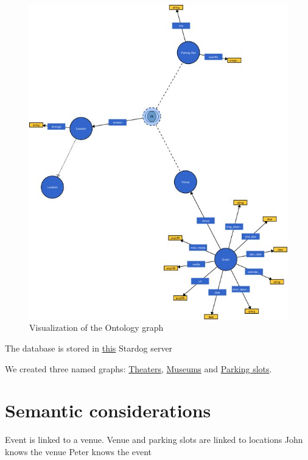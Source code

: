 \documentclass[runningheads,a4paper]{../../StyleFiles/llncs}
\begin{document}
\begin{figure}[h]
	\centering
	\includegraphics[width=1\textwidth]{img/vocab-graph.jpg}
	\caption{Visualization of the Ontology graph}
	\label{fig:instance}
\end{figure}

The database is stored in \href{http://stardog.krw.d2s.labs.vu.nl/#/databases/group6}{this} Stardog server

We created three named graphs: \href{http://data.krw.d2s.labs.vu.nl/doc/group6/findaslot/resource/findaslot/theaters}{Theaters}, \href{http://data.krw.d2s.labs.vu.nl/doc/group6/findaslot/resource/findaslot/museums}{Museums} and \href{http://data.krw.d2s.labs.vu.nl/doc/group6/findaslot/resource/findaslot/parking-slots}{Parking slots}.


\section{Semantic considerations}
Event is linked to a venue. Venue and parking slots are linked to locations
John knows the venue
Peter knows the event
\end{document}
